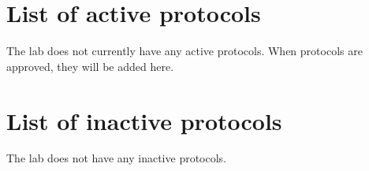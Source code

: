 \documentclass{tufte-book} %
\begin{document}
 \section{List of active protocols}
The lab does not currently have any active protocols.  When protocols
are approved, they will be added here.

 \section{List of inactive protocols}
The lab does not have any inactive protocols.













\end{document}
